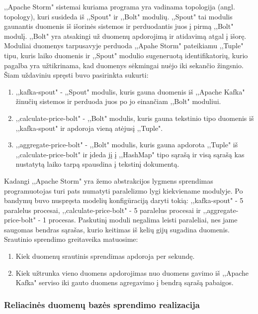 \documentclass{VUMIFPSkursinis}
\begin{document}
,,Apache Storm" sistemai kuriama programa yra vadinama topologija (angl. topology), kuri susideda iš ,,Spout" ir ,,Bolt" modulių. ,,Spout" tai modulis gaunantis duomenis
iš išorinės sistemos ir perduodantis juos į pirmą ,,Bolt" modulį. ,,Bolt" yra atsakingi už duomenų apdorojimą ir atidavimą atgal į išorę.
Moduliai duomenys tarpusavyje perduoda ,,Apahe Storm" pateikiamu ,,Tuple" tipu, kuris laiko duomenis ir ,,Spout" modulio sugeneruotą identifikatorių, 
kurio pagalba yra užtikrinama, kad duomenys sėkmingai nuėjo iki sekančio žingsnio. 
Šiam uždaviniu spręsti buvo pasirinkta sukurti:
\begin{enumerate}
    \item ,,kafka-spout" - ,,Spout" modulis, kuris gauna duomenis iš ,,Apache Kafka" žinučių sistemos ir perduoda juos po jo einančiam ,,Bolt" moduliui.
    \item ,,calculate-price-bolt" - ,,Bolt" modulis, kuris gauna tekstinio tipo duomenis iš ,,kafka-spout" ir apdoroja vieną atėjusį ,,Tuple".
    \item ,,aggregate-price-bolt" - ,,Bolt" modulis, kuris gauna apdorota ,,Tuple" iš ,,calculate-price-bolt" ir įdeda jį į ,,HashMap" tipo sąrašą ir visą sąrašą kas nustatytą laiko tarpą spausdina į tekstinį dokumentą.  
\end{enumerate}\par
Kadangi ,,Apache Storm" yra žemo abstrakcijos lygmens sprendimas programuotojas turi pats numatyti paralelizmo lygi kiekviename modulyje. 
Po bandymų buvo nuspręsta modelių konfigūraciją daryti tokią: ,,kafka-spout" - 5 paralelus procesai, ,,calculate-price-bolt"
 - 5 paralelus procesai ir ,,aggregate-price-bolt" - 1 procesas. Paskutinį moduli negalima leisti paraleliai, nes jame saugomas bendras sąrašas,
kurio keitimas iš kelių gijų sugadina duomenis. Srautinio sprendimo greitaveika matuosime:
\begin{enumerate}
    \item Kiek duomenų srautinis sprendimas apdoroja per sekundę.
    \item Kiek užtrunka vieno duomens apdorojimas nuo duomens gavimo iš ,,Apache Kafka" serviso iki gauto duomens agregavimo į bendrą sąrašą pabaigos.
\end{enumerate}

 \subsubsection{Reliacinės duomenų bazės sprendimo realizacija}
\end{document}
